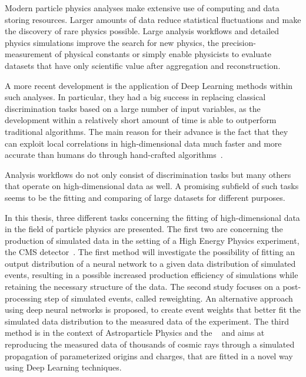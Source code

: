 
\label{sec:introduction}

Modern particle physics analyses make extensive use of computing and data storing resources. Larger amounts of data reduce statistical fluctuations and make the discovery of rare physics possible. Large analysis workflows and detailed physics simulations improve the search for new physics, the precision-measurement of physical constants or simply enable physicists to evaluate datasets that have only scientific value after aggregation and reconstruction.

A more recent development is the application of Deep Learning methods within such analyses. In particular, they had a big success in replacing classical discrimination tasks based on a large number of input variables, as the development within a relatively short amount of time is able to outperform traditional algorithms. The main reason for their advance is the fact that they can exploit local correlations in high-dimensional data much faster and more accurate than humans do through hand-crafted algorithms~\cite{intro-dnn1, intro-dnn2}.

Analysis workflows do not only consist of discrimination tasks but many others that operate on high-dimensional data as well. A promising subfield of such tasks seems to be the fitting and comparing of large datasets for different purposes.

In this thesis, three different tasks concerning the fitting of high-dimensional data in the field of particle physics are presented. The first two are concerning the production of simulated data in the setting of a High Energy Physics experiment, the CMS detector~\cite{cms}. The first method will investigate the possibility of fitting an output distribution of a neural network to a given data distribution of simulated events, resulting in a possible increased production efficiency of simulations while retaining the necessary structure of the data. The second study focuses on a post-processing step of simulated events, called reweighting. An alternative approach using deep neural networks is proposed, to create event weights that better fit the simulated data distribution to the measured data of the experiment. The third method is in the context of Astroparticle Physics and the \pao{}~\cite{ThePierreAugerCollaboration2016} and aims at reproducing the measured data of thousands of cosmic rays through a simulated propagation of parameterized origins and charges, that are fitted in a novel way using Deep Learning techniques.

